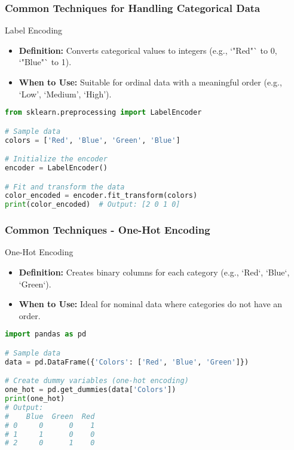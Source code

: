 \documentclass[aspectratio=169]{beamer}
\begin{document}
\begin{frame}[fragile]
    \frametitle{Common Techniques for Handling Categorical Data}
    \begin{block}{Label Encoding}
        \begin{itemize}
            \item \textbf{Definition:} Converts categorical values to integers (e.g., `"Red"` to 0, `"Blue"` to 1).
            \item \textbf{When to Use:} Suitable for ordinal data with a meaningful order (e.g., ‘Low’, ‘Medium’, ‘High’).
        \end{itemize}
        \begin{lstlisting}[language=Python]
from sklearn.preprocessing import LabelEncoder

# Sample data
colors = ['Red', 'Blue', 'Green', 'Blue']

# Initialize the encoder
encoder = LabelEncoder()

# Fit and transform the data
color_encoded = encoder.fit_transform(colors)
print(color_encoded)  # Output: [2 0 1 0]
        \end{lstlisting}
    \end{block}
\end{frame}

\begin{frame}[fragile]
    \frametitle{Common Techniques - One-Hot Encoding}
    \begin{block}{One-Hot Encoding}
        \begin{itemize}
            \item \textbf{Definition:} Creates binary columns for each category (e.g., `Red`, `Blue`, `Green`).
            \item \textbf{When to Use:} Ideal for nominal data where categories do not have an order.
        \end{itemize}
        \begin{lstlisting}[language=Python]
import pandas as pd

# Sample data
data = pd.DataFrame({'Colors': ['Red', 'Blue', 'Green']})

# Create dummy variables (one-hot encoding)
one_hot = pd.get_dummies(data['Colors'])
print(one_hot)
# Output:
#    Blue  Green  Red
# 0     0      0    1
# 1     1      0    0
# 2     0      1    0
        \end{lstlisting}
    \end{block}
\end{frame}
\end{document}
